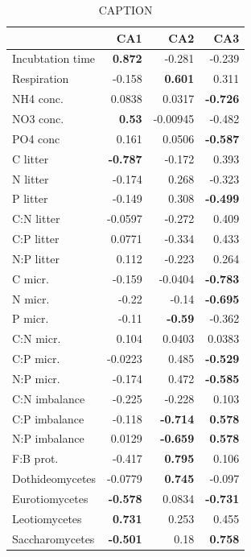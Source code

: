\documentclass[10pt]{article}
\begin{document}
\begin{flushleft}
\begin{table}[h!]
\begin{center}
\caption{CAPTION}
\label{catab}
{\small
\begin{tabular}{lrrr}
  \hline
 & CA1 & CA2 & CA3 \\ 
  \hline
Incubtation time & \textbf{0.872} & -0.281 & -0.239 \\ 
  Respiration & -0.158 & \textbf{0.601} & 0.311 \\ 
  NH4 conc. & 0.0838 & 0.0317 & \textbf{-0.726} \\ 
  NO3 conc. & \textbf{0.53} & -0.00945 & -0.482 \\ 
  PO4 conc & 0.161 & 0.0506 & \textbf{-0.587} \\ 
  C litter & \textbf{-0.787} & -0.172 & 0.393 \\ 
  N litter & -0.174 & 0.268 & -0.323 \\ 
  P litter & -0.149 & 0.308 & \textbf{-0.499} \\ 
  C:N litter & -0.0597 & -0.272 & 0.409 \\ 
  C:P litter & 0.0771 & -0.334 & 0.433 \\ 
  N:P litter & 0.112 & -0.223 & 0.264 \\ 
  C micr. & -0.159 & -0.0404 & \textbf{-0.783} \\ 
  N micr. & -0.22 & -0.14 & \textbf{-0.695} \\ 
  P micr. & -0.11 & \textbf{-0.59} & -0.362 \\ 
  C:N micr. & 0.104 & 0.0403 & 0.0383 \\ 
  C:P micr. & -0.0223 & 0.485 & \textbf{-0.529} \\ 
  N:P micr. & -0.174 & 0.472 & \textbf{-0.585} \\ 
  C:N imbalance & -0.225 & -0.228 & 0.103 \\ 
  C:P imbalance & -0.118 & \textbf{-0.714} & \textbf{0.578} \\ 
  N:P imbalance & 0.0129 & \textbf{-0.659} & \textbf{0.578} \\ 
  F:B prot. & -0.417 & \textbf{0.795} & 0.106 \\ 
  Dothideomycetes & -0.0779 & \textbf{0.745} & -0.097 \\ 
  Eurotiomycetes & \textbf{-0.578} & 0.0834 & \textbf{-0.731} \\ 
  Leotiomycetes & \textbf{0.731} & 0.253 & 0.455 \\ 
  Saccharomycetes & \textbf{-0.501} & 0.18 & \textbf{0.758} \\ 

\end{tabular}}
\end{center}
\end{table}
\end{flushleft}
\end{document}
